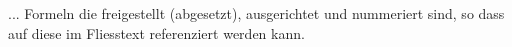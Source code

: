 
... Formeln die freigestellt (abgesetzt), ausgerichtet und  nummeriert sind, so dass auf diese im Fliesstext referenziert werden kann.
